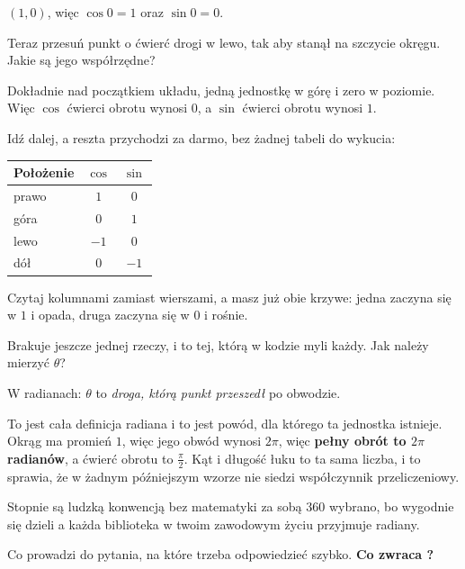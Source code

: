 \begin{fr}
\begin{ansblock}
$(1, 0)$, więc $\cos 0 = 1$ oraz $\sin 0 = 0$.
\end{ansblock}

Teraz przesuń punkt o ćwierć drogi w lewo, tak aby stanął na szczycie okręgu.
Jakie są jego współrzędne?
\nextframe
\end{fr}

\begin{fr}
Dokładnie nad początkiem układu, jedną jednostkę w górę i zero w poziomie.
Więc $\cos$ ćwierci obrotu wynosi $0$, a $\sin$ ćwierci obrotu wynosi $1$.

Idź dalej, a reszta przychodzi za darmo, bez żadnej tabeli do wykucia:

\begin{center}
\begin{tabular}{lcc}
\toprule
Położenie & $\cos$ & $\sin$ \\
\midrule
prawo & $1$ & $0$ \\
góra & $0$ & $1$ \\
lewo & $-1$ & $0$ \\
dół & $0$ & $-1$ \\
\bottomrule
\end{tabular}
\end{center}

Czytaj kolumnami zamiast wierszami, a masz już obie krzywe: jedna zaczyna się
w $1$ i opada, druga zaczyna się w $0$ i rośnie.

Brakuje jeszcze jednej rzeczy, i to tej, którą w kodzie myli każdy. Jak
należy mierzyć $\theta$?
\nextframe
\end{fr}

\begin{fr}
\begin{ansblock}
W radianach: $\theta$ to \emph{droga, którą punkt przeszedł} po obwodzie.
\end{ansblock}

To jest cała definicja radiana i to jest powód, dla którego ta jednostka
istnieje. Okrąg ma promień $1$, więc jego obwód wynosi $2\pi$, więc
\textbf{pełny obrót to $2\pi$ radianów}, a ćwierć obrotu to $\frac{\pi}{2}$.
Kąt i długość łuku to ta sama liczba, i to sprawia, że w żadnym późniejszym
wzorze nie siedzi współczynnik przeliczeniowy.

Stopnie są ludzką konwencją bez matematyki za sobą \dash{} $360$ wybrano,
bo wygodnie się dzieli \dash{} a każda biblioteka w twoim zawodowym życiu
przyjmuje radiany.

Co prowadzi do pytania, na które trzeba odpowiedzieć szybko. \textbf{Co
zwraca ?}
\dotline
\nextframe
\end{fr}

